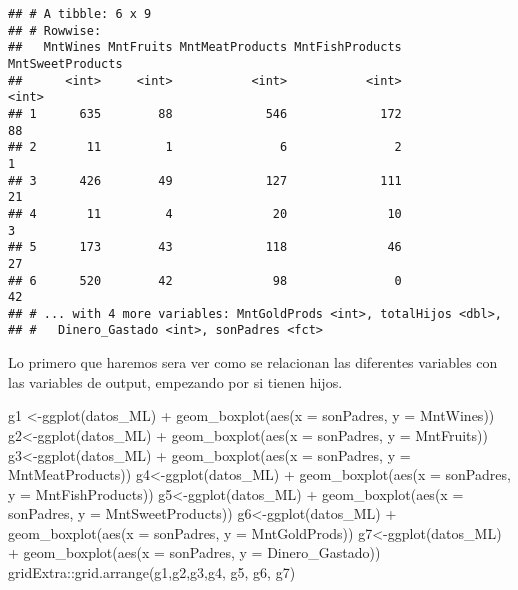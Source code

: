 \documentclass[
]{article}
\newenvironment{Shaded}{\begin{snugshade}}{\end{snugshade}}
\newcommand{\AttributeTok}[1]{\textcolor[rgb]{0.77,0.63,0.00}{#1}}
\newcommand{\FunctionTok}[1]{\textcolor[rgb]{0.00,0.00,0.00}{#1}}
\newcommand{\NormalTok}[1]{#1}
\newcommand{\OtherTok}[1]{\textcolor[rgb]{0.56,0.35,0.01}{#1}}
\newcommand{\SpecialCharTok}[1]{\textcolor[rgb]{0.00,0.00,0.00}{#1}}
\begin{document}
\begin{verbatim}
## # A tibble: 6 x 9
## # Rowwise: 
##   MntWines MntFruits MntMeatProducts MntFishProducts MntSweetProducts
##      <int>     <int>           <int>           <int>            <int>
## 1      635        88             546             172               88
## 2       11         1               6               2                1
## 3      426        49             127             111               21
## 4       11         4              20              10                3
## 5      173        43             118              46               27
## 6      520        42              98               0               42
## # ... with 4 more variables: MntGoldProds <int>, totalHijos <dbl>,
## #   Dinero_Gastado <int>, sonPadres <fct>
\end{verbatim}

Lo primero que haremos sera ver como se relacionan las diferentes
variables con las variables de output, empezando por si tienen hijos.

\begin{Shaded}
\begin{Highlighting}[]
\NormalTok{g1 }\OtherTok{\textless{}{-}}\FunctionTok{ggplot}\NormalTok{(datos\_ML) }\SpecialCharTok{+} 
  \FunctionTok{geom\_boxplot}\NormalTok{(}\FunctionTok{aes}\NormalTok{(}\AttributeTok{x =}\NormalTok{ sonPadres, }\AttributeTok{y =}\NormalTok{ MntWines))}
\NormalTok{g2}\OtherTok{\textless{}{-}}\FunctionTok{ggplot}\NormalTok{(datos\_ML) }\SpecialCharTok{+} 
  \FunctionTok{geom\_boxplot}\NormalTok{(}\FunctionTok{aes}\NormalTok{(}\AttributeTok{x =}\NormalTok{ sonPadres, }\AttributeTok{y =}\NormalTok{ MntFruits))}
\NormalTok{g3}\OtherTok{\textless{}{-}}\FunctionTok{ggplot}\NormalTok{(datos\_ML) }\SpecialCharTok{+} 
  \FunctionTok{geom\_boxplot}\NormalTok{(}\FunctionTok{aes}\NormalTok{(}\AttributeTok{x =}\NormalTok{ sonPadres, }\AttributeTok{y =}\NormalTok{ MntMeatProducts))}
\NormalTok{g4}\OtherTok{\textless{}{-}}\FunctionTok{ggplot}\NormalTok{(datos\_ML) }\SpecialCharTok{+} 
  \FunctionTok{geom\_boxplot}\NormalTok{(}\FunctionTok{aes}\NormalTok{(}\AttributeTok{x =}\NormalTok{ sonPadres, }\AttributeTok{y =}\NormalTok{ MntFishProducts))}
\NormalTok{g5}\OtherTok{\textless{}{-}}\FunctionTok{ggplot}\NormalTok{(datos\_ML) }\SpecialCharTok{+} 
  \FunctionTok{geom\_boxplot}\NormalTok{(}\FunctionTok{aes}\NormalTok{(}\AttributeTok{x =}\NormalTok{ sonPadres, }\AttributeTok{y =}\NormalTok{ MntSweetProducts))}
\NormalTok{g6}\OtherTok{\textless{}{-}}\FunctionTok{ggplot}\NormalTok{(datos\_ML) }\SpecialCharTok{+} 
  \FunctionTok{geom\_boxplot}\NormalTok{(}\FunctionTok{aes}\NormalTok{(}\AttributeTok{x =}\NormalTok{ sonPadres, }\AttributeTok{y =}\NormalTok{ MntGoldProds))}
\NormalTok{g7}\OtherTok{\textless{}{-}}\FunctionTok{ggplot}\NormalTok{(datos\_ML) }\SpecialCharTok{+} 
  \FunctionTok{geom\_boxplot}\NormalTok{(}\FunctionTok{aes}\NormalTok{(}\AttributeTok{x =}\NormalTok{ sonPadres, }\AttributeTok{y =}\NormalTok{ Dinero\_Gastado))}
\NormalTok{gridExtra}\SpecialCharTok{::}\FunctionTok{grid.arrange}\NormalTok{(g1,g2,g3,g4, g5, g6, g7)}
\end{Highlighting}
\end{Shaded}
\end{document}
